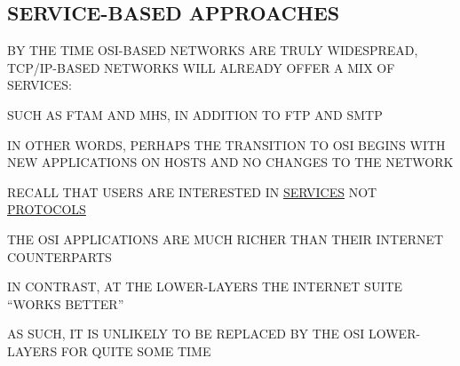 \begin{bwslide}
\part	{SERVICE-BASED APPROACHES}\bf

\begin{nrtc}
\item	BY THE TIME OSI-BASED NETWORKS ARE TRULY WIDESPREAD,
	TCP/IP-BASED NETWORKS WILL ALREADY OFFER A MIX OF SERVICES:
    \begin{nrtc}
    \item	SUCH AS FTAM AND MHS, IN ADDITION TO FTP AND SMTP
    \end{nrtc}

\item	IN OTHER WORDS, PERHAPS THE TRANSITION TO OSI BEGINS WITH NEW
	APPLICATIONS ON HOSTS AND NO CHANGES TO THE NETWORK
\end{nrtc}
\end{bwslide}


\begin{bwslide}

\begin{nrtc}
\item	RECALL THAT USERS ARE INTERESTED IN \underline{SERVICES} NOT
	\underline{PROTOCOLS}

\item	THE OSI APPLICATIONS ARE MUCH RICHER THAN THEIR INTERNET COUNTERPARTS

\item	IN CONTRAST, AT THE LOWER-LAYERS THE INTERNET SUITE ``WORKS BETTER''
    \begin{nrtc}
    \item	AS SUCH, IT IS UNLIKELY TO BE REPLACED BY THE OSI LOWER-LAYERS
		FOR QUITE SOME TIME
    \end{nrtc}
\end{nrtc}
\end{bwslide}


